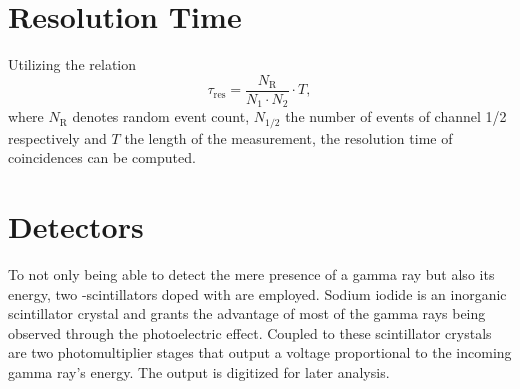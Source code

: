 \section{Resolution Time}
Utilizing the relation
\begin{equation}\label{eq:res_time}
	\tau_\text{res}=\frac{N_\text{R}}{N_1\cdot N_2}\cdot T,
\end{equation}
where $N_\text{R}$ denotes random event count, $N_{1/2}$ the number of events of channel 1/2 respectively and $T$ the length of the measurement, the resolution time of coincidences can be computed. 

\section{Detectors}
To not only being able to detect the mere presence of a gamma ray but also its energy, two -scintillators doped with  are employed.
Sodium iodide is an inorganic scintillator crystal and grants the advantage of most of the gamma rays being observed through the photoelectric effect.
Coupled to these scintillator crystals are two photomultiplier stages that output a voltage proportional to the incoming gamma ray's energy. 
The output is digitized for later analysis.
